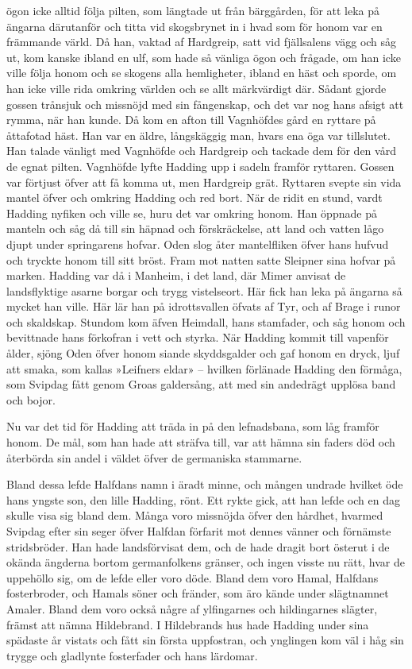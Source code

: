 ögon icke alltid följa pilten, som längtade ut från bärggården, för att
leka på ängarna därutanför och titta vid skogsbrynet in i hvad som för
honom var en främmande värld. Då han, vaktad af Hardgreip, satt vid
fjällsalens vägg och såg ut, kom kanske ibland en ulf, som hade så
vänliga ögon och frågade, om han icke ville följa honom och se skogens
alla hemligheter, ibland en häst och sporde, om han icke ville rida
omkring världen och se allt märkvärdigt där. Sådant gjorde gossen
trånsjuk och missnöjd med sin fångenskap, och det var nog hans afsigt
att rymma, när han kunde. Då kom en afton till Vagnhöfdes gård en
ryttare på åttafotad häst. Han var en äldre, långskäggig man, hvars ena
öga var tillslutet. Han talade vänligt med Vagnhöfde och Hardgreip och
tackade dem för den vård de egnat pilten. Vagnhöfde lyfte Hadding upp i
sadeln framför ryttaren. Gossen var förtjust öfver att få komma ut, men
Hardgreip grät. Ryttaren svepte sin vida mantel öfver och omkring
Hadding och red bort. När de ridit en stund, vardt Hadding nyfiken och
ville se, huru det var omkring honom. Han öppnade på manteln och såg då
till sin häpnad och förskräckelse, att land och vatten lågo djupt under
springarens hofvar. Oden slog åter mantelfliken öfver hans hufvud och
tryckte honom till sitt bröst. Fram mot natten satte Sleipner sina
hofvar på marken. Hadding var då i Manheim, i det land, där Mimer
anvisat de landsflyktige asarne borgar och trygg vistelseort. Här fick
han leka på ängarna så mycket han ville. Här lär han på idrottsvallen
öfvats af Tyr, och af Brage i runor och skaldskap. Stundom kom äfven
Heimdall, hans stamfader, och såg honom och bevittnade hans förkofran i
vett och styrka. När Hadding kommit till vapenför ålder, sjöng Oden
öfver honom siande skyddsgalder och gaf honom en dryck, ljuf att smaka,
som kallas »Leifners eldar» -- hvilken förlänade Hadding den förmåga,
som Svipdag fått genom Groas galdersång, att med sin andedrägt upplösa
band och bojor.

Nu var det tid för Hadding att träda in på den lefnadsbana, som låg
framför honom. De mål, som han hade att
sträfva till, var att hämna sin faders död och återbörda sin andel i
väldet öfver de germaniska stammarne.

Bland dessa lefde Halfdans namn i äradt minne, och mången undrade
hvilket öde hans yngste son, den lille Hadding, rönt. Ett rykte gick,
att han lefde och en dag skulle visa sig bland dem. Många voro missnöjda
öfver den hårdhet, hvarmed Svipdag efter sin seger öfver Halfdan
förfarit mot dennes vänner och förnämste stridsbröder. Han hade
landsförvisat dem, och de hade dragit bort österut i de okända ängderna
bortom germanfolkens gränser, och ingen visste nu rätt, hvar de
uppehöllo sig, om de lefde eller voro döde. Bland dem voro Hamal,
Halfdans fosterbroder, och Hamals söner och fränder, som äro kände under
slägtnamnet Amaler. Bland dem voro också någre af ylfingarnes och
hildingarnes slägter, främst att nämna Hildebrand. I Hildebrands hus
hade Hadding under sina spädaste år vistats och fått sin första
uppfostran, och ynglingen kom väl i håg sin trygge och gladlynte
fosterfader och hans lärdomar.

